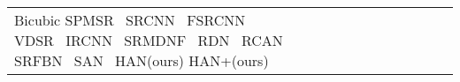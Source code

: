 \documentclass[runningheads]{llncs}
\begin{document}
\begin{table}[t]
\begin{tabular}{|p{6.5em}|p{2.5em}|p{2.5em}|p{3em}|p{2.5em}|p{3em}|p{2.5em}|p{3em}|p{2.5em}|p{3em}|p{2.5em}|p{3em}|}
		Bicubic \newline{}SPMSR~\cite{peleg2014statistical} \newline{}SRCNN~\cite{dong2014learning}  \newline{}FSRCNN~\cite{dong2016accelerating} \newline{}VDSR~\cite{kim2016accurate} \newline{}IRCNN~\cite{zhang2017learning}  \newline{}SRMDNF~\cite{zhang2018learning} \newline{}RDN~\cite{zhang2018residual} \newline{}RCAN~\cite{zhang2018image} \newline{} SRFBN~\cite{li2019feedback} \newline{} SAN~\cite{dai2019second} \newline{} HAN(ours) \newline{} HAN+(ours)	& 
		 \newline{} \newline{} \newline{} \newline{} \newline{} \newline{} \newline{} \newline{} \newline{}  \newline{} \newline{} \newline{} 

\end{tabular}
\end{table}
\end{document}
